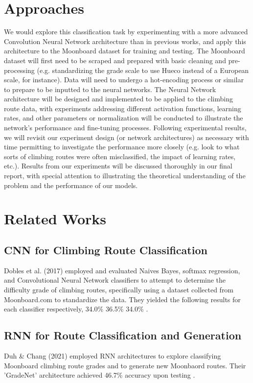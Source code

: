 \documentclass[10pt]{article}
\begin{document}
\section{Approaches}
We would explore this classification task by experimenting with a more advanced
Convolution Neural Network architecture than in previous works,
and apply this architecture to the Moonboard dataset for training and
testing. The Moonboard dataset will first need to be scraped and prepared with
basic cleaning and pre-processing (e.g. standardizing the grade scale to use
Hueco instead of a European scale, for instance). Data will need to undergo a
hot-encoding process or similar to prepare to be inputted to the neural
networks. The Neural Network architecture will be designed and implemented to be
applied to the climbing route data, with experiments addressing different
activation functions, learning rates, and other parameters or normalization
will be conducted to illustrate the network's performance and fine-tuning
processes. Following experimental results, we will revisit our experiment
design (or network architectures) as necessary with time permitting to
investigate the performance more closely (e.g. look to what sorts of climbing
routes were often misclassified, the impact of learning rates, etc.). Results from
our experiments will be discussed thoroughly in our final report, with special
attention to illustrating the theoretical understanding of the problem and the
performance of our models.

\section{Related Works}
\subsection{CNN for Climbing Route Classification}
Dobles et al. (2017) employed and evaluated Naives Bayes, softmax regression,
and Convolutional Neural Network classifiers to attempt to determine the
difficulty grade of climbing routes, specifically using a dataset collected
from Moonboard.com to standardize the data. They yielded the following
results for each classifier respectively, 34.0\% 36.5\% 34.0\% \cite{dobles_sarmiento_satterthwaite_2017}.

\subsection{RNN for Route Classification and Generation}
Duh \& Chang (2021) employed RNN architectures to explore classifying
Moonboard climbing route grades and to generate new Moonbaord routes. Their
'GradeNet' architecture achieved 46.7\% accuracy upon testing \cite{DBLP:journals/corr/abs-2102-01788}.
\end{document}
